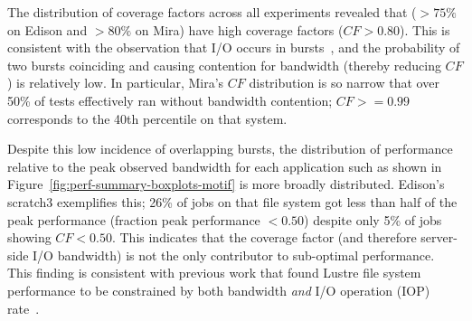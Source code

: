 The distribution of coverage factors across all experiments revealed that ($> 75\%$ on Edison and $> 80\%$ on Mira) have high coverage factors ($\mathit{CF} > 0.80$).
This is consistent with the observation that I/O occurs in bursts~\cite{Carns2011,Liu2016}, and the probability of two bursts coinciding and causing contention for bandwidth (thereby reducing $\mathit{CF}$) is relatively low.
In particular, Mira's $\mathit{CF}$ distribution is so narrow that over 50\% of tests effectively ran without bandwidth contention; $\mathit{CF} >= 0.99$ corresponds to the 40th percentile on that system.

Despite this low incidence of overlapping bursts, the distribution of performance relative to the peak observed bandwidth for each application such as shown in Figure~\ref{fig:perf-summary-boxplots-motif} is more broadly distributed.
Edison's scratch3 exemplifies this; 26\% of jobs on that file system got less than half of the peak performance (fraction peak performance $< 0.50$) despite only 5\% of jobs showing $\mathit{CF} < 0.50$.  This indicates that the coverage factor (and therefore server-side I/O bandwidth) is not the only contributor to sub-optimal performance.
This finding is consistent with previous work that found Lustre file system performance to be constrained by both bandwidth \emph{and} I/O operation (IOP) rate~\cite{Uselton2013}.

% 
% 

